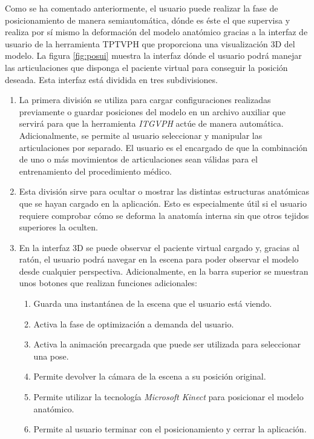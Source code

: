Como se ha comentado anteriormente, el usuario puede realizar la fase de posicionamiento de manera semiautomática, dónde es éste el que supervisa y realiza por sí mismo la deformación del modelo anatómico gracias a la interfaz de usuario de la herramienta \ac{TPTVPH} que proporciona una visualización 3D del modelo.
La figura \ref{fig:posui} muestra la interfaz dónde el usuario podrá manejar las articulaciones que disponga el paciente virtual para conseguir la posición deseada. Esta interfaz está dividida en tres subdivisiones. 
\begin{enumerate}
    \item La primera división se utiliza para cargar configuraciones realizadas previamente o guardar posiciones del modelo en un archivo auxiliar que servirá para que la herramienta \emph{ITGVPH} actúe de manera automática. Adicionalmente, se permite al usuario seleccionar y manipular las articulaciones por separado. El usuario es el encargado de que la combinación de uno o más movimientos de articulaciones sean válidas para el entrenamiento del procedimiento médico. 
    \item Esta división sirve para ocultar o mostrar las distintas estructuras anatómicas que se hayan cargado en la aplicación. Esto es especialmente útil si el usuario requiere comprobar cómo se deforma la anatomía interna sin que otros tejidos superiores la oculten.
    \item En la interfaz 3D se puede observar el paciente virtual cargado y, gracias al ratón, el usuario podrá navegar en la escena para poder observar el modelo desde cualquier perspectiva. Adicionalmente, en la barra superior se muestran unos botones que realizan funciones adicionales:
    \begin{enumerate}
   \item Guarda una instantánea de la escena que el usuario está viendo. 
   \item Activa la fase de optimización a demanda del usuario. 
   \item Activa la animación precargada que puede ser utilizada para seleccionar una pose. 
   \item Permite devolver la cámara de la escena a su posición original. 
   \item Permite utilizar la tecnología \emph{Microsoft Kinect} para posicionar el modelo anatómico.
   \item   Permite al usuario terminar con el posicionamiento y cerrar la aplicación.
    \end{enumerate}
    
\end{enumerate}


